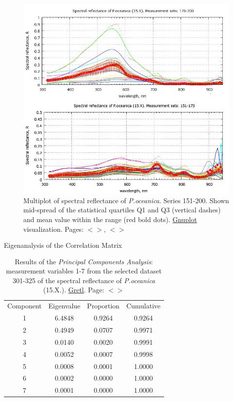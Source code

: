 \documentclass[11pt]{article}
\begin{document}
\begin{appendices}
\begin{figure}[H]
	\begin{center}
		\includegraphics[scale=0.35]{GNU-15.jpg}
		\caption{Multiplot of spectral reflectance of \textit{P.oceanica}. Series 151-200. Shown mid-spread of the statistical quartiles Q1 and Q3 (vertical dashes) and mean value within the range (red bold dots). \href{http://www.gnuplot.info/}{Gnuplot} visualization­. Pages: $<$\pageref{page-28}$>$, $<$\pageref{page-39}$>$}
		\label{fig:A.28}
	\end{center}
\end{figure}
\begin{table}[H]\footnotesize
	\caption{Results of the \textit{Principal Components Analysis}: measurement variables 1-7 from the selected dataset 301-325 of the spectral reflectance of \textit{P.oceanica} (15.X.). \href{http://gretl.sourceforge.net/}{Gretl}. Page: $<$\pageref{page-41}$>$}
	\begin{center}
	Eigenanalysis of the Correlation Matrix\\
	\vspace{1em}

		\begin{tabular}{|c|c|c|c|}
			{Component } &  {Eigenvalue } & {Proportion} & {Cumulative} \\
			1 &   6.4848    &   0.9264    &   0.9264 \\
			2 & 0.4949 &      0.0707  &     0.9971 \\
			3 &  0.0140    &   0.0020    &   0.9991 \\
			4 &    0.0052  &     0.0007    &   0.9998 \\
			5 &   0.0008   &    0.0001     &  1.0000 \\
			6 &  0.0002    &   0.0000      & 1.0000 \\
			7 &   0.0001   &    0.0000     &  1.0000 \\
		\end{tabular}


\end{center}
\end{table}
\end{appendices}
\end{document}
